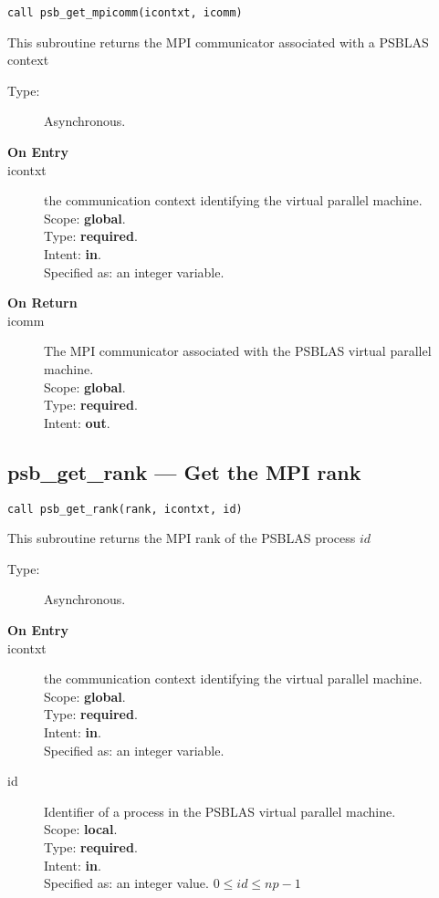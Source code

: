 \begin{verbatim}
call psb_get_mpicomm(icontxt, icomm)
\end{verbatim}

This subroutine returns the MPI communicator associated with a PSBLAS context
\begin{description}
\item[Type:] Asynchronous.
\item[\bf  On Entry ]
\item[icontxt] the communication context identifying the virtual
  parallel machine.\\
Scope: {\bf global}.\\
Type: {\bf required}.\\
Intent: {\bf in}.\\
Specified as: an integer variable.
\end{description}

\begin{description}
\item[\bf On Return]
\item[icomm] The MPI communicator associated with the  PSBLAS virtual parallel machine.\\
Scope: {\bf global}.\\
Type: {\bf required}.\\
Intent: {\bf out}.\\
\end{description}


\clearpage\subsection*{psb\_get\_rank --- Get the MPI rank}

\begin{verbatim}
call psb_get_rank(rank, icontxt, id)
\end{verbatim}

This subroutine returns the MPI rank of the  PSBLAS process $id$
\begin{description}
\item[Type:] Asynchronous.
\item[\bf  On Entry ]
\item[icontxt] the communication context identifying the virtual
  parallel machine.\\
Scope: {\bf global}.\\
Type: {\bf required}.\\
Intent: {\bf in}.\\
Specified as: an integer variable.
\item[id] Identifier of a   process in the PSBLAS virtual parallel machine.\\
Scope: {\bf local}.\\
Type: {\bf required}.\\
Intent: {\bf in}.\\
Specified as: an integer value. $0 \le id \le np-1$\
\end{description}

